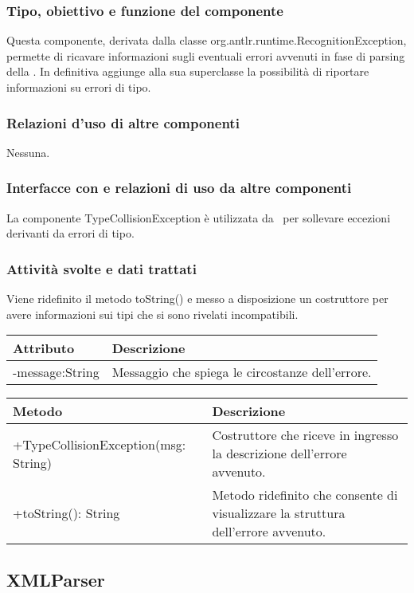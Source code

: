\subsubsection{Tipo, obiettivo e funzione del componente}
Questa componente, derivata dalla classe org.antlr.runtime.RecognitionException, permette di ricavare informazioni sugli eventuali errori avvenuti in fase di parsing della \br. In definitiva aggiunge alla sua superclasse la possibilit\`a di riportare informazioni su errori di tipo.
\subsubsection{Relazioni d'uso di altre componenti}
Nessuna.
\subsubsection{Interfacce con e relazioni di uso da altre componenti}
La componente TypeCollisionException \`e utilizzata da \brp\ per sollevare eccezioni derivanti da errori di tipo.
\subsubsection{Attivit\`a svolte e dati trattati}
Viene ridefinito il metodo toString() e messo a disposizione un costruttore per avere informazioni sui tipi che si sono rivelati incompatibili.
\begin{center}
\begin{tabular}{||p{6cm}||p{6cm}||} \hline
Attributo & Descrizione \\  \hline
-message:String & Messaggio che spiega le circostanze dell'errore. \\ \hline
\end{tabular}
\end{center}
\begin{center}
\begin{tabular}{||p{6cm}||p{6cm}||} \hline
Metodo & Descrizione \\  \hline
+TypeCollisionException(msg: String) & Costruttore che riceve in ingresso la descrizione dell'errore avvenuto.\\ \hline
+toString(): String & Metodo ridefinito che consente di visualizzare la struttura dell'errore avvenuto.\\ \hline
\end{tabular}
\end{center}

\subsection{XMLParser}%
